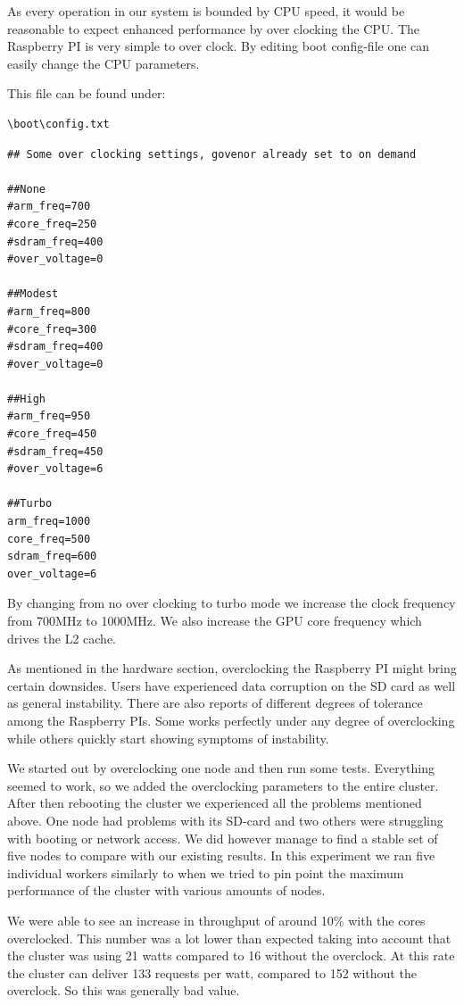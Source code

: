 As every operation in our system is bounded by CPU speed, it would be reasonable to expect enhanced performance by over clocking the CPU. The Raspberry PI is very simple to over clock. By editing boot config-file one can easily change the CPU parameters.

This file can be found under:

\begin{lstlisting}
\boot\config.txt
\end{lstlisting} 

\begin{lstlisting}
## Some over clocking settings, govenor already set to on demand

##None
#arm_freq=700
#core_freq=250
#sdram_freq=400
#over_voltage=0

##Modest
#arm_freq=800
#core_freq=300
#sdram_freq=400
#over_voltage=0

##High
#arm_freq=950
#core_freq=450
#sdram_freq=450
#over_voltage=6

##Turbo
arm_freq=1000
core_freq=500
sdram_freq=600
over_voltage=6
\end{lstlisting}

By changing from no over clocking to turbo mode we increase the clock frequency from 700MHz to 1000MHz. We also increase the GPU core frequency which drives the L2 cache.

As mentioned in the hardware section, overclocking the Raspberry PI might bring certain downsides. Users have experienced data corruption on the SD card as well as general instability. There are also reports of different degrees of tolerance among the Raspberry PIs. Some works perfectly under any degree of overclocking while others quickly start showing symptoms of instability.

We started out by overclocking one node and then run some tests. Everything seemed to work, so we added the overclocking parameters to the entire cluster. After then rebooting the cluster we experienced all the problems mentioned above. One node had problems with its SD-card and two others were struggling with booting or network access. We did however manage to find a stable set of five nodes to compare with our existing results. In this experiment we ran five individual workers similarly to when we tried to pin point the maximum performance of the cluster with various amounts of nodes. 

We were able to see an increase in throughput of around 10\% with the cores overclocked. This number was a lot lower than expected taking into account that the cluster was using 21 watts compared to 16 without the overclock. At this rate the cluster can deliver 133 requests per watt, compared to 152 without the overclock. So this was generally bad value.

